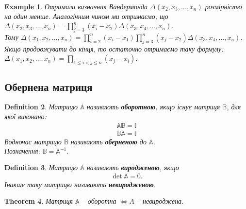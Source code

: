 \documentclass[a4paper, 10pt]{article}
\theoremstyle{theoremdd}
\newtheorem{theorem}{Theorem}[subsection]
\newtheorem{definition}[theorem]{Definition}
\newtheorem{example}[theorem]{Example}
\begin{document}
\begin{example}
Отримали визначник Вандермонда $\Delta (x_2,x_3,\dots,x_n)$ розмірністю на один менше. Аналогічним чином ми отримаємо, що $\Delta (x_2,x_3,\dots,x_n) = \displaystyle\prod_{j=3}^n (x_i-x_2) \Delta (x_3,x_4,\dots,x_n)$.\\
Тому $\Delta (x_1,x_2,\dots,x_n) = \displaystyle\prod_{i=2}^n (x_i-x_1) \prod_{j=3}^n (x_j-x_2) \Delta (x_3,x_4,\dots,x_n)$.\\
Якщо продовжувати до кінця, то остаточно отримаємо таку формулу:\\
$\Delta (x_1,x_2,\dots,x_n) = \displaystyle\prod_{1 \leq i<j \leq n} (x_j-x_i)$.
\end{example}

\subsection{Обернена матриця}
\begin{definition}
Матрицю $\mathbb{A}$ називають \textbf{оборотною}, якщо існує матриця $\mathbb{B}$, для якої виконано:
\begin{align*}
\mathbb{A} \mathbb{B} = \mathbb{I} \\
\mathbb{B} \mathbb{A} = \mathbb{I}
\end{align*}
Водночас матрицю $\mathbb{B}$ називають \textbf{оберненою} до $\mathbb{A}$.\\
Позначення: $\mathbb{B} = \mathbb{A}^{-1}$.
\end{definition}

\begin{definition}
Матрицю $\mathbb{A}$ називають \textbf{виродженою}, якщо
\begin{align*}
\det \mathbb{A} = 0.
\end{align*}
Інакше таку матрицю називають \textbf{невиродженою}.
\end{definition}

\begin{theorem}
Матриця $\mathbb{A}$ -- оборотна $\iff A$ -- невироджена.
\end{theorem}
\end{document}
